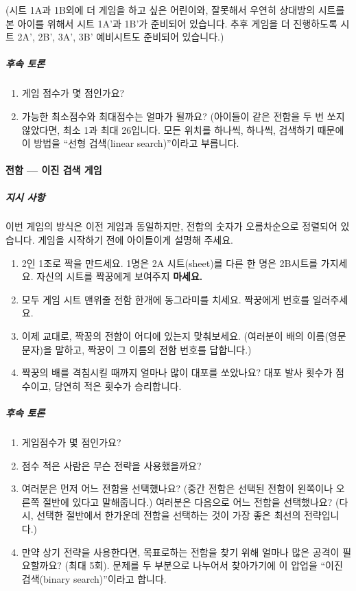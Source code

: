 \documentclass[]{article}
\begin{document}
(시트 1A과 1B외에 더 게임을 하고 싶은 어린이와, 잘못해서 우연히 상대방의
시트를 본 아이를 위해서 시트 1A'과 1B'가 준비되어 있습니다. 추후 게임을
더 진행하도록 시트 2A', 2B', 3A', 3B' 예비시트도 준비되어 있습니다.)

\subparagraph{후속 토론}\label{section-95}

\begin{enumerate}
\item
  게임 점수가 몇 점인가요?
\item
  가능한 최소점수와 최대점수는 얼마가 될까요? (아이들이 같은 전함을 두
  번 쏘지 않았다면, 최소 1과 최대 26입니다. 모든 위치를 하나씩, 하나씩,
  검색하기 때문에 이 방법을 ``선형 검색(linear search)''이라고 부릅니다.
\end{enumerate}

\mbox{}\paragraph{전함 --- 이진 검색 게임}\label{mdash----1}

\subparagraph{지시 사항}\label{section-96}

이번 게임의 방식은 이전 게임과 동일하지만, 전함의 숫자가 오름차순으로
정렬되어 있습니다. 게임을 시작하기 전에 아이들이게 설명해 주세요.

\begin{enumerate}
\item
  2인 1조로 짝을 만드세요. 1명은 2A 시트(sheet)를 다른 한 명은 2B시트를
  가지세요. 자신의 시트를 짝꿍에게 보여주지 \textbf{마세요.}
\item
  모두 게임 시트 맨위줄 전함 한개에 동그라미를 치세요. 짝꿍에게 번호를
  일러주세요.
\item
  이제 교대로, 짝꿍의 전함이 어디에 있는지 맞춰보세요. (여러분이 배의
  이름(영문 문자)을 말하고, 짝꿍이 그 이름의 전함 번호를 답합니다.)
\item
  짝꿍의 배를 격침시킬 때까지 얼마나 많이 대포를 쏘았나요? 대포 발사
  횟수가 점수이고, 당연히 적은 횟수가 승리합니다.
\end{enumerate}

\subparagraph{후속 토론}\label{section-97}

\begin{enumerate}
\item
  게임점수가 몇 점인가요?
\item
  점수 적은 사람은 무슨 전략을 사용했을까요?
\item
  여러분은 먼저 어느 전함을 선택했나요? (중간 전함은 선택된 전함이
  왼쪽이나 오른쪽 절반에 있다고 말해줍니다.) 여러분은 다음으로 어느
  전함을 선택했나요? (다시, 선택한 절반에서 한가운데 전함을 선택하는
  것이 가장 좋은 최선의 전략입니다.)
\item
  만약 상기 전략을 사용한다면, 목표로하는 전함을 찾기 위해 얼마나 많은
  공격이 필요할까요? (최대 5회). 문제를 두 부분으로 나누어서 찾아가기에
  이 압업을 ``이진 검색(binary search)''이라고 합니다.
\end{enumerate}
\end{document}
